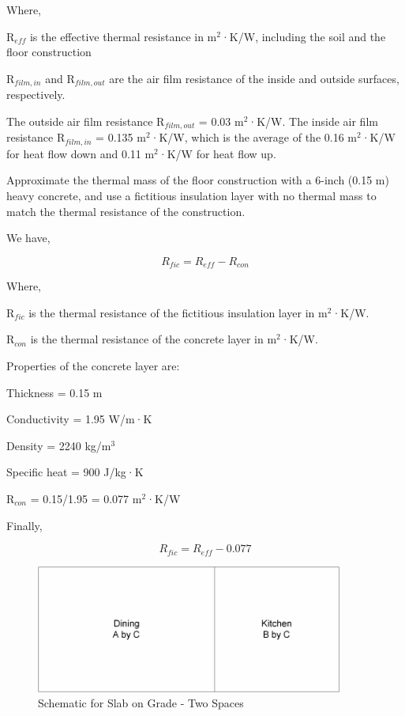 Where,

R\(_{eff}\) is the effective thermal resistance in m\(^{2}\)·K/W, including the soil and the floor construction

R\(_{film,in}\) and R\(_{film,out}\) are the air film resistance of the inside and outside surfaces, respectively.

The outside air film resistance R\(_{film,out}\) = 0.03 m\(^{2}\)·K/W. The inside air film resistance R\(_{film,in}\) = 0.135 m\(^{2}\)·K/W, which is the average of the 0.16 m\(^{2}\)·K/W for heat flow down and 0.11 m\(^{2}\)·K/W for heat flow up.

Approximate the thermal mass of the floor construction with a 6-inch (0.15 m) heavy concrete, and use a fictitious insulation layer with no thermal mass to match the thermal resistance of the construction.

We have,

\begin{equation}
R_{fic} = R_{eff} - R_{con}
\end{equation}

Where,

R\(_{fic}\) is the thermal resistance of the fictitious insulation layer in m\(^{2}\)·K/W.

R\(_{con}\) is the thermal resistance of the concrete layer in m\(^{2}\)·K/W.

Properties of the concrete layer are:

Thickness = 0.15 m

Conductivity = 1.95 W/m·K

Density = 2240 kg/m\(^{3}\)

Specific heat = 900 J/kg·K

R\(_{con}\) = 0.15/1.95 = 0.077 m\(^{2}\)·K/W

Finally,

\begin{equation}
R_{fic} = R_{eff} - 0.077
\end{equation}

\begin{figure}[hbtp] %
\centering
\includegraphics[width=0.9\textwidth, height=0.9\textheight, keepaspectratio=true]{media/image435.png}
\caption{Schematic for Slab on Grade - Two Spaces \protect \label{fig:schematic-for-slab-on-grade-two-spaces}}
\end{figure}

